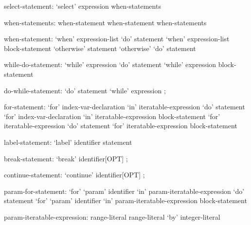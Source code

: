 \begin{syntax}
select-statement:
  `select' expression { when-statements }
\end{syntax}

\begin{syntax}
when-statements:
  when-statement
  when-statement when-statements
\end{syntax}

\begin{syntax}
when-statement:
  `when' expression-list `do' statement
  `when' expression-list block-statement
  `otherwise' statement
  `otherwise' `do' statement
\end{syntax}

\begin{syntax}
while-do-statement:
  `while' expression `do' statement
  `while' expression block-statement
\end{syntax}

\begin{syntax}
do-while-statement:
  `do' statement `while' expression ;
\end{syntax}

\begin{syntax}
for-statement:
  `for' index-var-declaration `in' iteratable-expression `do' statement
  `for' index-var-declaration `in' iteratable-expression block-statement
  `for' iteratable-expression `do' statement
  `for' iteratable-expression block-statement
\end{syntax}

\begin{syntax}
label-statement:
  `label' identifier statement
\end{syntax}

\begin{syntax}
break-statement:
  `break' identifier[OPT] ;
\end{syntax}

\begin{syntax}
continue-statement:
  `continue' identifier[OPT] ;
\end{syntax}

\begin{syntax}
param-for-statement:
  `for' `param' identifier `in' param-iteratable-expression `do' statement
  `for' `param' identifier `in' param-iteratable-expression block-statement
\end{syntax}

\begin{syntax}
param-iteratable-expression:
  range-literal
  range-literal `by' integer-literal
\end{syntax}


